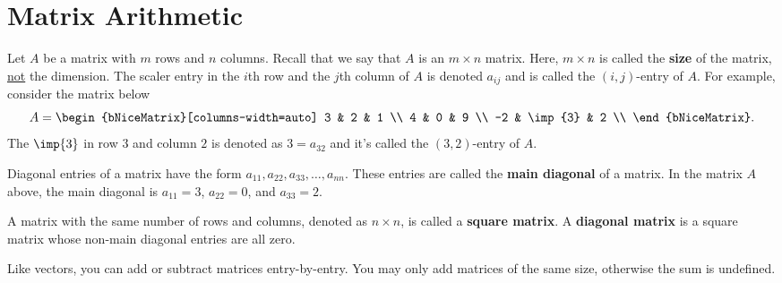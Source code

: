 
\section{Matrix Arithmetic}
\label{sec:matrix_arithmetic}

Let $A$ be a matrix with $m$ rows and $n$ columns. Recall that we say that $A$
is an $m \times n$ matrix. Here, $m \times n$ is called the \textbf{size} of the
matrix, \underline{not} the dimension. The scaler entry in the $i$th row and
the $j$th column of $A$ is denoted $a_{ij}$ and is called the $(i, j)$-entry of
$A$. For example, consider the matrix below
\[%
  A = \begin{bNiceMatrix}[columns-width=auto]
    3 & 2 & 1 \\
    4 & 0 & 9 \\
    -2 & \imp{3} & 2 \\
  \end{bNiceMatrix}
.\]%
The $\imp{3}$ in row $3$ and column $2$ is denoted as $3 = a_{32}$ and
it's called the $(3,2)$-entry of $A$.

Diagonal entries of a matrix have the form $a_{11}, a_{22}, a_{33}, \dots,
a_{nn}$. These entries are called the \textbf{main diagonal} of a matrix. In the
matrix $A$ above, the main diagonal is $a_{11} = 3$, $a_{22} = 0$, and $a_{33} =
2$.

\begin{definition}
  \label{def:square_matrix}

  A matrix with the same number of rows and columns, denoted as $n \times n$, is
  called a \textbf{square matrix}. A \textbf{diagonal matrix} is a square matrix
  whose non-main diagonal entries are all zero.
\end{definition}

Like vectors, you can add or subtract matrices entry-by-entry. You may only add
matrices of the same size, otherwise the sum is undefined.

